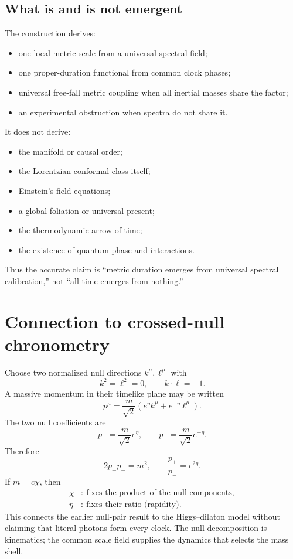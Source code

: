 \documentclass[11pt,a4paper]{article}
\begin{document}
\subsection{What is and is not emergent}

The construction derives:
\begin{itemize}
  \item one local metric scale from a universal spectral field;
  \item one proper-duration functional from common clock phases;
  \item universal free-fall metric coupling when all inertial masses share the factor;
  \item an experimental obstruction when spectra do not share it.
\end{itemize}

It does not derive:
\begin{itemize}
  \item the manifold or causal order;
  \item the Lorentzian conformal class itself;
  \item Einstein's field equations;
  \item a global foliation or universal present;
  \item the thermodynamic arrow of time;
  \item the existence of quantum phase and interactions.
\end{itemize}

Thus the accurate claim is ``metric duration emerges from universal spectral calibration,'' not ``all time emerges from nothing.''

\section{Connection to crossed-null chronometry}

Choose two normalized null directions $k^\mu,\ell^\mu$ with
\[
 k^2=\ell^2=0,
 \qquad
 k\cdot\ell=-1.
\]
A massive momentum in their timelike plane may be written
\[
 p^\mu=\frac{m}{\sqrt2}
 \left(e^\eta k^\mu+e^{-\eta}\ell^\mu\right).
\]
The two null coefficients are
\[
 p_+=\frac{m}{\sqrt2}e^\eta,
 \qquad
 p_-=\frac{m}{\sqrt2}e^{-\eta}.
\]
Therefore
\[
 2p_+p_-=m^2,
 \qquad
 \frac{p_+}{p_-}=e^{2\eta}.
\]
If $m=c\chi$, then
\[
\boxed{
\begin{aligned}
\chi&:\ \text{fixes the product of the null components},\\
\eta&:\ \text{fixes their ratio (rapidity)}.
\end{aligned}
}
\]
This connects the earlier null-pair result to the Higgs--dilaton model without claiming that literal photons form every clock. The null decomposition is kinematics; the common scale field supplies the dynamics that selects the mass shell.
\end{document}
